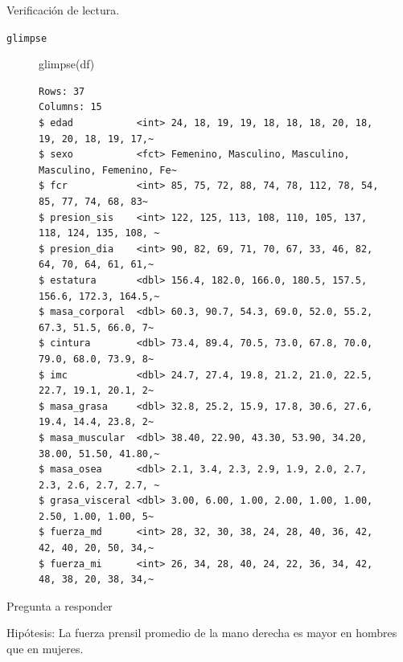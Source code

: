 \documentclass[
  ignorenonframetext,
]{beamer}
\newenvironment{Shaded}{\begin{snugshade}}{\end{snugshade}}
\newcommand{\FunctionTok}[1]{\textcolor[rgb]{0.28,0.35,0.67}{#1}}
\newcommand{\NormalTok}[1]{\textcolor[rgb]{0.00,0.23,0.31}{#1}}
\begin{document}
\begin{frame}[fragile]{Verificación de lectura.}
\label{verificaciuxf3n-de-lectura.-1}
\begin{block}{\texttt{glimpse}}
\label{glimpse}
\begin{figure}

\begin{Shaded}
\begin{Highlighting}[]
\FunctionTok{glimpse}\NormalTok{(df)}
\end{Highlighting}
\end{Shaded}

\begin{verbatim}
Rows: 37
Columns: 15
$ edad           <int> 24, 18, 19, 19, 18, 18, 18, 20, 18, 19, 20, 18, 19, 17,~
$ sexo           <fct> Femenino, Masculino, Masculino, Masculino, Femenino, Fe~
$ fcr            <int> 85, 75, 72, 88, 74, 78, 112, 78, 54, 85, 77, 74, 68, 83~
$ presion_sis    <int> 122, 125, 113, 108, 110, 105, 137, 118, 124, 135, 108, ~
$ presion_dia    <int> 90, 82, 69, 71, 70, 67, 33, 46, 82, 64, 70, 64, 61, 61,~
$ estatura       <dbl> 156.4, 182.0, 166.0, 180.5, 157.5, 156.6, 172.3, 164.5,~
$ masa_corporal  <dbl> 60.3, 90.7, 54.3, 69.0, 52.0, 55.2, 67.3, 51.5, 66.0, 7~
$ cintura        <dbl> 73.4, 89.4, 70.5, 73.0, 67.8, 70.0, 79.0, 68.0, 73.9, 8~
$ imc            <dbl> 24.7, 27.4, 19.8, 21.2, 21.0, 22.5, 22.7, 19.1, 20.1, 2~
$ masa_grasa     <dbl> 32.8, 25.2, 15.9, 17.8, 30.6, 27.6, 19.4, 14.4, 23.8, 2~
$ masa_muscular  <dbl> 38.40, 22.90, 43.30, 53.90, 34.20, 38.00, 51.50, 41.80,~
$ masa_osea      <dbl> 2.1, 3.4, 2.3, 2.9, 1.9, 2.0, 2.7, 2.3, 2.6, 2.7, 2.7, ~
$ grasa_visceral <dbl> 3.00, 6.00, 1.00, 2.00, 1.00, 1.00, 2.50, 1.00, 1.00, 5~
$ fuerza_md      <int> 28, 32, 30, 38, 24, 28, 40, 36, 42, 42, 40, 20, 50, 34,~
$ fuerza_mi      <int> 26, 34, 28, 40, 24, 22, 36, 34, 42, 48, 38, 20, 38, 34,~
\end{verbatim}

\end{figure}%
\end{block}
\end{frame}

\begin{frame}{Pregunta a responder}
\label{pregunta-a-responder}
\begin{tcolorbox}[enhanced jigsaw, colbacktitle=quarto-callout-important-color!10!white, coltitle=black, title=\textcolor{quarto-callout-important-color}{\faExclamation}\hspace{0.5em}{Important}, breakable, bottomrule=.15mm, colback=white, toprule=.15mm, bottomtitle=1mm, toptitle=1mm, titlerule=0mm, rightrule=.15mm, arc=.35mm, leftrule=.75mm, colframe=quarto-callout-important-color-frame, opacitybacktitle=0.6, left=2mm, opacityback=0]

Hipótesis: La fuerza prensil promedio de la mano derecha es mayor en
hombres que en mujeres.

\end{tcolorbox}
\end{frame}
\end{document}
